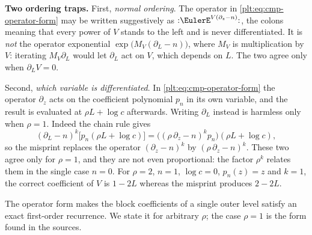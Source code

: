 \documentclass[11pt,oneside]{article}
\theoremstyle{plain}
\theoremstyle{definition}
\theoremstyle{remark}
\begin{document}
\begin{warningbox}
\textbf{Two ordering traps.}
First, \emph{normal ordering}.  The operator in
\eqref{plt:eq:cmp-operator-form} may be written suggestively as
\(\mathopen{:}\EulerE^{V(\partial_z-n)}\mathclose{:}\), the colons meaning
that every power of \(V\) stands to the left and is never differentiated.  It
is \emph{not} the operator exponential \(\exp\bigl(M_V(\partial_L-n)\bigr)\),
where \(M_V\) is multiplication by \(V\): iterating \(M_V\partial_L\) would let
\(\partial_L\) act on \(V\), which depends on \(L\).  The two agree only when
\(\partial_LV=0\).

Second, \emph{which variable is differentiated}.  In
\eqref{plt:eq:cmp-operator-form} the operator \(\partial_z\) acts on the
coefficient polynomial \(p_n\) in its own variable, and the result is
evaluated at \(\rho L+\log c\) afterwards.  Writing \(\partial_L\) instead is
harmless only when \(\rho=1\).  Indeed the chain rule gives
\[
 (\partial_L-n)^{k}\bigl[p_n(\rho L+\log c)\bigr]
 =\bigl((\rho\,\partial_z-n)^{k}p_n\bigr)(\rho L+\log c),
\]
so the misprint replaces the operator \((\partial_z-n)^{k}\) by
\((\rho\,\partial_z-n)^{k}\).  These two agree only for \(\rho=1\), and they
are not even proportional: the factor \(\rho^{k}\) relates them in the single
case \(n=0\).  For \(\rho=2\), \(n=1\), \(\log c=0\), \(p_n(z)=z\) and
\(k=1\), the correct coefficient of \(V\) is \(1-2L\) whereas the misprint
produces \(2-2L\).
\end{warningbox}

The operator form makes the block coefficients of a single outer level satisfy
an exact first-order recurrence.  We state it for arbitrary \(\rho\); the case
\(\rho=1\) is the form found in the sources.
\end{document}
